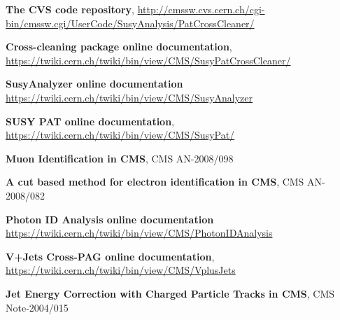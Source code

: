 \documentclass{cmspaper}
\begin{document}
\pagebreak
\begin{thebibliography}{9}
 {\bf The CVS code repository},
\underline{http://cmssw.cvs.cern.ch/cgi-bin/cmssw.cgi/UserCode/SusyAnalysis/PatCrossCleaner/}

 {\bf Cross-cleaning package online documentation},
\underline{https://twiki.cern.ch/twiki/bin/view/CMS/SusyPatCrossCleaner/}

 {\bf SusyAnalyzer online documentation}
\underline{https://twiki.cern.ch/twiki/bin/view/CMS/SusyAnalyzer}

 {\bf SUSY PAT online documentation},
\underline{https://twiki.cern.ch/twiki/bin/view/CMS/SusyPat/}

 {\bf Muon Identification in CMS}, CMS AN-2008/098 

 {\bf A cut based method for electron identification in CMS}, CMS AN-2008/082 

 {\bf Photon ID Analysis online documentation} 
\underline{https://twiki.cern.ch/twiki/bin/view/CMS/PhotonIDAnalysis}

 {\bf V+Jets Cross-PAG online documentation},
\underline{https://twiki.cern.ch/twiki/bin/view/CMS/VplusJets}

 {\bf Jet Energy Correction with Charged Particle Tracks in CMS}, CMS Note-2004/015 

\end{thebibliography}

\end{document}
